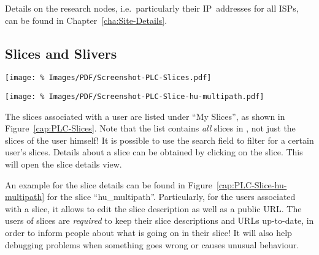 Details on the research nodes, i.e.\ particularly their IP~addresses for all ISPs, can be found in Chapter~\ref{cha:Site-Details}.


\subsection{Slices and Slivers}
\label{sub:Slices-and-Slivers}

\begin{figure*}
\begin{center}
\texttt{[image: \%
   Images/PDF/Screenshot-PLC-Slices.pdf]}
\end{center}
\caption{The List of All Slices}
\label{cap:PLC-Slices}
\end{figure*}

\begin{figure*}
\begin{center}
\texttt{[image: \%
   Images/PDF/Screenshot-PLC-Slice-hu-multipath.pdf]}
\end{center}
\caption{My Slices $\rightarrow$ hu\_multipath}
\label{cap:PLC-Slice-hu-multipath}
\end{figure*}


The slices associated with a user are listed under ``My Slices'', as shown in Figure~\ref{cap:PLC-Slices}. Note that the list contains \emph{all} slices in , not just the slices of the user himself! It is possible to use the search field to filter for a certain user's slices. Details about a slice can be obtained by clicking on the slice. This will open the slice details view.

An example for the slice details can be found in Figure~\ref{cap:PLC-Slice-hu-multipath} for the slice ``hu\_multipath''. Particularly, for the users associated with a slice, it allows to edit the slice description as well as a public URL. The users of  slices are \emph{required} to keep their slice descriptions and URLs up-to-date, in order to inform people about what is going on in their slice! It will also help debugging problems when something goes wrong or causes unusual behaviour.

